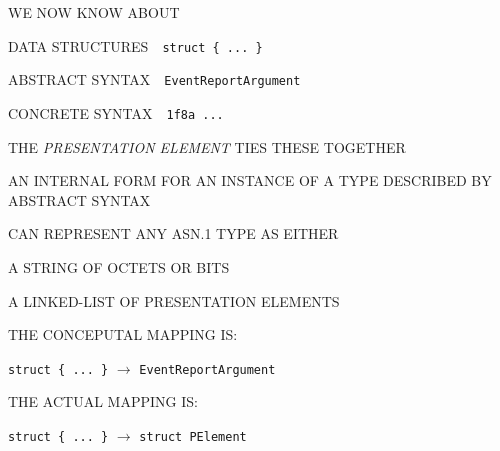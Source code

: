 \begin{bwslide}
\bf

\begin{nrtc}
\item	WE NOW KNOW ABOUT
    \begin{nrtc}
    \item	DATA STRUCTURES\ \ \verb"struct { ... }"

    \item	ABSTRACT SYNTAX\ \ \verb"EventReportArgument"

    \item	CONCRETE SYNTAX\ \ \verb"1f8a ..."
    \end{nrtc}

\item	THE \emph{PRESENTATION ELEMENT} TIES THESE TOGETHER
\end{nrtc}
\end{bwslide}


\begin{bwslide}

\begin{nrtc}
\item	AN INTERNAL FORM FOR AN INSTANCE OF A TYPE DESCRIBED BY ABSTRACT
	SYNTAX

\item	CAN REPRESENT ANY ASN.1 TYPE AS EITHER
    \begin{nrtc}
    \item	A STRING OF OCTETS OR BITS

    \item	A LINKED-LIST OF PRESENTATION ELEMENTS
    \end{nrtc}

\item	THE CONCEPUTAL MAPPING IS:
    \begin{nrtc}
    \item	\verb"struct { ... }" $\rightarrow$ \verb"EventReportArgument"
    \end{nrtc}

\item	THE ACTUAL MAPPING IS:
    \begin{nrtc}
    \item	\verb"struct { ... }" $\rightarrow$ \verb"struct PElement"
    \end{nrtc}
\end{nrtc}
\end{bwslide}


